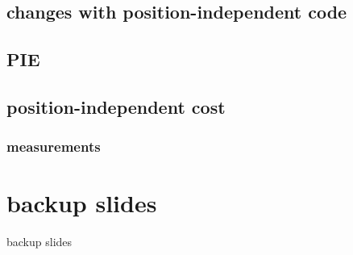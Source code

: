 \subsection{changes with position-independent code}


\subsection{PIE}


\subsection{position-independent cost}


\subsubsection{measurements}


\section{backup slides}
\begin{frame}{backup slides}
\end{frame}





